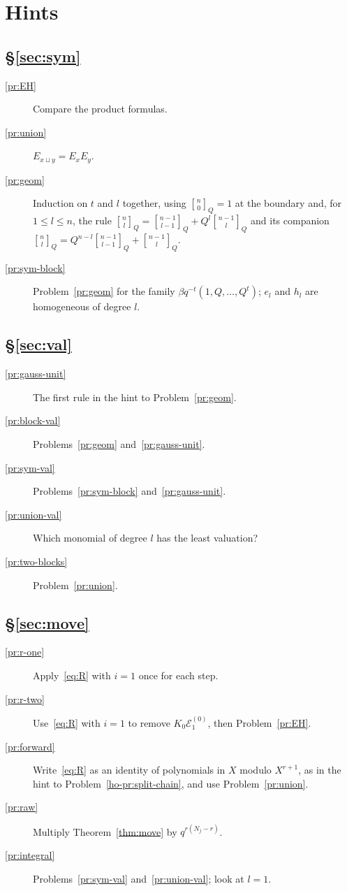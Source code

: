 \documentclass[reqno]{amsart}
\theoremstyle{definition}
\theoremstyle{plain}
\theoremstyle{remark}
\newcommand{\Ec}{\mathcal{E}}
\newcommand{\qbinom}[3]{\genfrac{[}{]}{0pt}{}{#1}{#2}_{#3}}
\begin{document}
\section*{Hints}

\subsection*{\S\ref{sec:sym}}
\begin{description}
\item[\ref{pr:EH}] Compare the product formulas.
\item[\ref{pr:union}] \(E_{x \sqcup y} = E_x E_y\).
\item[\ref{pr:geom}] Induction on \(t\) and \(l\) together, using \(\qbinom{n}{0}{Q} = 1\) at the boundary and, for \(1 \le l \le n\), the rule \(\qbinom{n}{l}{Q} = \qbinom{n-1}{l-1}{Q} + Q^l \qbinom{n-1}{l}{Q}\) and its companion \(\qbinom{n}{l}{Q} = Q^{n-l}\qbinom{n-1}{l-1}{Q} + \qbinom{n-1}{l}{Q}\).
\item[\ref{pr:sym-block}] Problem~\ref{pr:geom} for the family \(\beta q^{-t}(1, Q, \dots, Q^t)\); \(e_l\) and \(h_l\) are homogeneous of degree \(l\).
\end{description}

\subsection*{\S\ref{sec:val}}
\begin{description}
\item[\ref{pr:gauss-unit}] The first rule in the hint to Problem~\ref{pr:geom}.
\item[\ref{pr:block-val}] Problems~\ref{pr:geom} and~\ref{pr:gauss-unit}.
\item[\ref{pr:sym-val}] Problems~\ref{pr:sym-block} and~\ref{pr:gauss-unit}.
\item[\ref{pr:union-val}] Which monomial of degree \(l\) has the least valuation?
\item[\ref{pr:two-blocks}] Problem~\ref{pr:union}.
\end{description}

\subsection*{\S\ref{sec:move}}
\begin{description}
\item[\ref{pr:r-one}] Apply~\eqref{eq:R} with \(i = 1\) once for each step.
\item[\ref{pr:r-two}] Use~\eqref{eq:R} with \(i = 1\) to remove \(K_0\Ec^{(0)}_1\), then Problem~\ref{pr:EH}.
\item[\ref{pr:forward}] Write~\eqref{eq:R} as an identity of polynomials in \(X\) modulo \(X^{r+1}\), as in the hint to Problem~\ref{ho-pr:split-chain}, and use Problem~\ref{pr:union}.
\item[\ref{pr:raw}] Multiply Theorem~\ref{thm:move} by \(q^{r(N_j - r)}\).
\item[\ref{pr:integral}] Problems~\ref{pr:sym-val} and~\ref{pr:union-val}; look at \(l = 1\).
\end{description}
\end{document}
